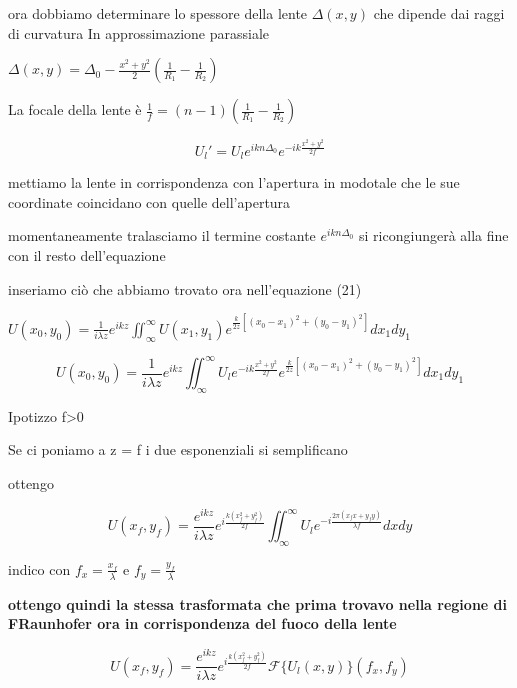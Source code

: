 \documentclass{article}
\begin{document}
ora dobbiamo determinare lo spessore della lente $\Delta (x,y)$ che dipende dai raggi di curvatura In approssimazione parassiale

$\Delta(x,y) = \Delta_{0} - \frac{x^{2}+ y^{2}}{2}  (\frac{1}{R_{1}} -\frac{1}{R_{2}} )$

La focale della lente è 
$\frac{1}{f} = (n-1)(\frac{1}{R_{1}} -\frac{1}{R_{2}} )$

\begin{equation}
U_{l}'=U_{l} e^{i k n \Delta_{0}} e^{- i k \frac{x^{2}+ y^{2}}{2 f} } 
\end{equation}

mettiamo la lente in corrispondenza con l'apertura in modotale che le sue coordinate coincidano con quelle dell'apertura 

momentaneamente tralasciamo il termine costante $e^{i k n \Delta_{0}}$ si ricongiungerà alla fine con il resto dell'equazione %

inseriamo ciò che abbiamo trovato ora nell'equazione (21)

$
U(x_{0}, y_{0})= \frac{1}{i \lambda z} e^{i k z}  \iint_{\infty}^{\infty} U(x_{1}, y_{1}) e^{\frac{k}{2z} [(x_{0}- x_{1})^{2} + (y_{0}- y_{1})^{2}]}dx_{1}dy_{1}
$

\begin{equation}
U(x_{0}, y_{0})= \frac{1}{i \lambda z} e^{i k z}  \iint_{\infty}^{\infty} U_{l}  e^{- i k \frac{x^{2}+ y^{2}}{2 f} } e^{\frac{k}{2z} [(x_{0}- x_{1})^{2} + (y_{0}- y_{1})^{2}]}dx_{1}dy_{1}
\end{equation}

Ipotizzo f>0

Se  ci poniamo a z = f i due esponenziali si semplificano

ottengo

\begin{equation}
U(x_{f}, y_{f})= \frac{ e^{i k z}}{i \lambda z} e^{i \frac{k (x_{f}^{2} + y_{f}^{2})}{2f}} \iint_{\infty}^{\infty} U_{l}  e^{-i 		\frac{2\pi (x_{f} x + y_{f} y)}{\lambda f}		}dxdy
\end{equation}


indico con $f_{x} = \frac{x_{f}}{\lambda}$ e $f_{y} = \frac{y_{f}}{\lambda}$


\textbf{ottengo quindi la stessa trasformata che prima trovavo nella regione di FRaunhofer ora in corrispondenza del fuoco della lente}

\begin{equation}
U(x_{f}, y_{f}) =  \frac{ e^{i k z}}{i \lambda z} e^{i \frac{k (x_{f}^{2} + y_{f}^{2})}{2f}} \mathscr{F} \{	U_{l}(x,y)	\} ( f_{x}, f_{y})
\end{equation}
\end{document}
